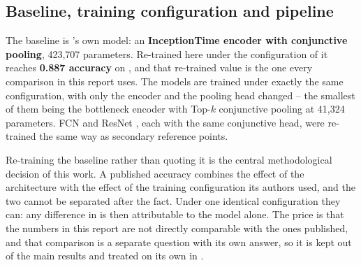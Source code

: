 \subsection{Baseline, training configuration and pipeline}
\label{sec:setup:baselines}
\label{sec:setup:protocol}
\label{sec:setup:pipeline}

The baseline is \millet{}'s own model: an \textbf{InceptionTime encoder with conjunctive pooling},
423{,}707 parameters. Re-trained here under the configuration of  it reaches
\textbf{0.887 accuracy} on \webtraffic{}, and that re-trained value is the one every comparison in
this report uses. The \seanet{} models are trained under exactly the same configuration, with only
the encoder and the pooling head changed -- the smallest of them being the \seanet{} bottleneck
encoder with Top-$k$ conjunctive pooling at 41{,}324 parameters. FCN and ResNet
\citep{wang2017fcn}, each with the same conjunctive head, were re-trained the same way as secondary
reference points.

Re-training the baseline rather than quoting it is the central methodological decision of this work.
A published accuracy combines the effect of the architecture with the effect of the training
configuration its authors used, and the two cannot be separated after the fact. Under one identical
configuration they can: any difference in  is then attributable to the model
alone. The price is that the numbers in this report are not directly comparable with the ones
\millet{} published, and that comparison is a separate question with its own answer, so it is kept
out of the main results and treated on its own in .

